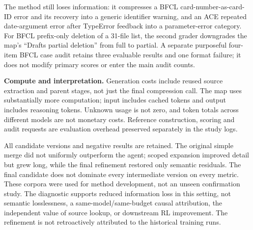 The method still loses information: it compresses a BFCL card-number-as-card-ID
error and its recovery into a generic identifier warning, and an ACE repeated
date-argument error after TypeError feedback into a parameter-error category.
For BFCL prefix-only deletion of a 31-file list, the second grader downgrades
the map's ``Drafts partial deletion'' from full to partial. A separate purposeful
four-item BFCL case audit retains three evaluable results and one format
failure; it does not modify primary scores or enter the main audit counts.

\textbf{Compute and interpretation.}\quad
Generation costs include reused source extraction and parent stages, not just
the final compression call. The map uses substantially more computation; input
includes cached tokens and output includes reasoning tokens. Unknown usage is
not zero, and token totals across different models are not monetary costs.
Reference construction, scoring and audit requests are evaluation overhead
preserved separately in the study logs.

\begin{table}[ht]
\centering\small
\setlength{\tabcolsep}{4pt}

\caption{Recorded generation tokens in millions; cached input is a subset of
input. Unknown-usage requests are disclosed separately. These totals describe
the studied prototype, not an efficiency-matched comparison.}
\end{table}

All candidate versions and negative results are retained. The original simple
merge did not uniformly outperform the agent; scoped expansion improved detail
but grew long, while the final refinement restored only semantic residuals.
The final candidate does not dominate every intermediate version on every
metric. These corpora were used for method development, not an unseen
confirmation study. The diagnostic supports reduced information loss in this
setting, not semantic losslessness, a same-model/same-budget causal attribution,
the independent value of source lookup, or downstream RL improvement. The
refinement is not retroactively attributed to the historical training runs.

